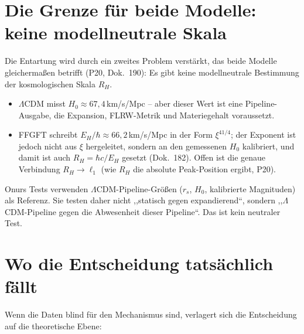 \section{Die Grenze für beide Modelle: keine modellneutrale Skala}

Die Entartung wird durch ein zweites Problem verstärkt, das beide Modelle
gleichermaßen betrifft (P20, Dok.~190): Es gibt keine modellneutrale
Bestimmung der kosmologischen Skala $R_H$.

\begin{itemize}
  \item $\Lambda$CDM misst $H_0 \approx 67{,}4$\,km/s/Mpc -- aber dieser
        Wert ist eine Pipeline-Ausgabe, die Expansion, FLRW-Metrik und
        Materiegehalt voraussetzt.
  \item FFGFT schreibt $E_H/\hbar \approx 66{,}2$\,km/s/Mpc in der Form
        $\xi^{41/4}$; der Exponent ist jedoch nicht aus $\xi$ hergeleitet,
        sondern an den gemessenen $H_0$ kalibriert, und damit ist auch
        $R_H = \hbar c/E_H$ gesetzt (Dok.~182). Offen ist die genaue Verbindung $R_H \to \ell_1$
        (wie $R_H$ die absolute Peak-Position ergibt, P20).
\end{itemize}

Onurs Tests verwenden $\Lambda$CDM-Pipeline-Größen ($r_s$, $H_0$,
kalibrierte Magnituden) als Referenz. Sie testen daher nicht ,,statisch
gegen expandierend``, sondern ,,$\Lambda$CDM-Pipeline gegen die Abwesenheit
dieser Pipeline``. Das ist kein neutraler Test.

\section{Wo die Entscheidung tatsächlich fällt}

Wenn die Daten blind für den Mechanismus sind, verlagert sich die
Entscheidung auf die theoretische Ebene:

